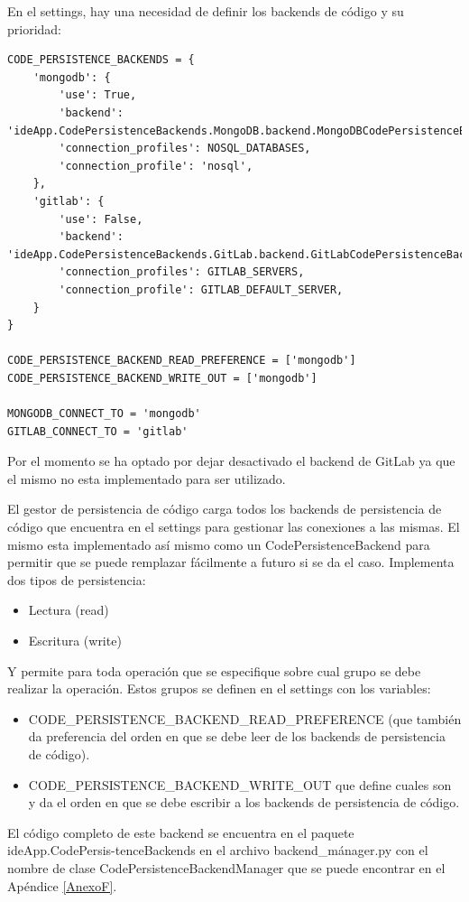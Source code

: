 En el settings, hay una necesidad de definir los backends de código y su prioridad:
\lstset{language=Python}
\begin{lstlisting}[breaklines]
CODE_PERSISTENCE_BACKENDS = {
    'mongodb': {
        'use': True,
        'backend': 'ideApp.CodePersistenceBackends.MongoDB.backend.MongoDBCodePersistenceBackend',
        'connection_profiles': NOSQL_DATABASES,
        'connection_profile': 'nosql',
    },
    'gitlab': {
        'use': False,
        'backend': 'ideApp.CodePersistenceBackends.GitLab.backend.GitLabCodePersistenceBackend',
        'connection_profiles': GITLAB_SERVERS,
        'connection_profile': GITLAB_DEFAULT_SERVER,
    }
}

CODE_PERSISTENCE_BACKEND_READ_PREFERENCE = ['mongodb']
CODE_PERSISTENCE_BACKEND_WRITE_OUT = ['mongodb']

MONGODB_CONNECT_TO = 'mongodb'
GITLAB_CONNECT_TO = 'gitlab'
\end{lstlisting}
\lstset{language=Bash}

Por el momento se ha optado por dejar desactivado el backend de GitLab ya que el mismo no esta implementado para ser utilizado.

El gestor de persistencia de código  carga todos los backends de persistencia de código que encuentra en el settings para gestionar las conexiones a las mismas. El mismo esta implementado así mismo como un CodePersistenceBackend para permitir que se puede remplazar fácilmente a futuro si se da el caso. Implementa dos tipos de persistencia:
\begin{itemize}
	\item Lectura (read)
	\item Escritura (write) 
\end{itemize}
Y permite para toda operación que se especifique sobre cual grupo se debe realizar la operación. Estos grupos se definen en el settings con los variables:
\begin{itemize}
	\item CODE\_PERSISTENCE\_BACKEND\_READ\_PREFERENCE (que también da preferencia del orden en que se debe leer de los backends de persistencia de código).
	\item CODE\_PERSISTENCE\_BACKEND\_WRITE\_OUT que define cuales son y da el orden en que se debe escribir a los backends de persistencia de código.
\end{itemize}
El código completo de este backend se encuentra en el paquete ideApp.CodePersis-tenceBackends en el archivo backend\_mánager.py con el nombre de clase CodePersistenceBackendManager que se puede encontrar en el Apéndice \ref{AnexoF}.

